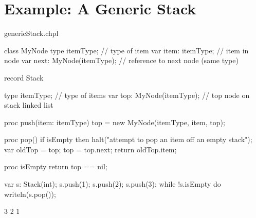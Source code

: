 \section{Example: A Generic Stack}
\label{Example_Generic_Stack}
\begin{chapelexample}{genericStack.chpl}
\begin{chapel}
class MyNode {
  type itemType;              // type of item
  var item: itemType;         // item in node
  var next: MyNode(itemType); // reference to next node (same type)
}

record Stack {
  type itemType;             // type of items
  var top: MyNode(itemType); // top node on stack linked list

  proc push(item: itemType) {
    top = new MyNode(itemType, item, top);
  }

  proc pop() {
    if isEmpty then
      halt("attempt to pop an item off an empty stack");
    var oldTop = top;
    top = top.next;
    return oldTop.item;
  }

  proc isEmpty return top == nil;
}
\end{chapel}
\begin{chapelpost}
var s: Stack(int);
s.push(1);
s.push(2);
s.push(3);
while !s.isEmpty do
  writeln(s.pop());
\end{chapelpost}
\begin{chapeloutput}
3
2
1
\end{chapeloutput}
\end{chapelexample}
